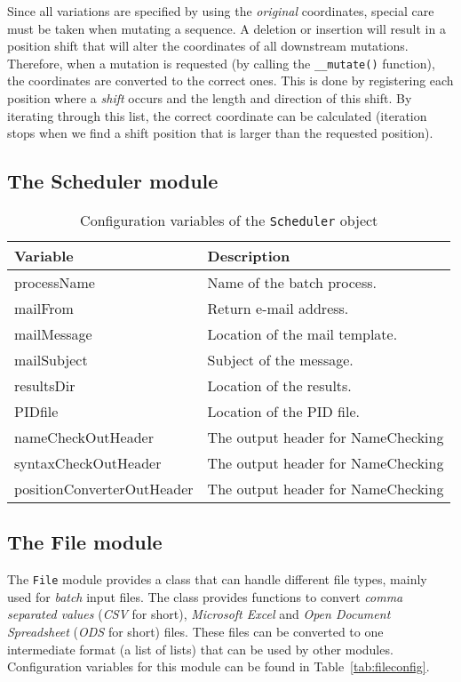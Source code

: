 \documentclass{article}
\begin{document}
Since all variations are specified by using the \emph{original} coordinates,
special care must be taken when mutating a sequence. A deletion or insertion
will result in a position shift that will alter the coordinates of all
downstream mutations. Therefore, when a mutation is requested (by calling the
\texttt{\_\_mutate()} function), the coordinates are converted to the correct
ones. This is done by registering each position where a \emph{shift} occurs
and the length and direction of this shift. By iterating through this list, the
correct coordinate can be calculated (iteration stops when we find a shift
position that is larger than the requested position).

\subsection{The Scheduler module} \label{subsec:scheduler}

\begin{table}[H]
\begin{center}
\begin{tabular}{l|l}
Variable                   & Description \\
\hline
processName                & Name of the batch process. \\
mailFrom                   & Return e-mail address. \\
mailMessage                & Location of the mail template. \\
mailSubject                & Subject of the message. \\
resultsDir                 & Location of the results. \\
PIDfile                    & Location of the PID file. \\
nameCheckOutHeader         & The output header for NameChecking \\
syntaxCheckOutHeader       & The output header for NameChecking \\
positionConverterOutHeader & The output header for NameChecking
\end{tabular}
\caption{Configuration variables of the \texttt{Scheduler} object}
\label{tab:schedulerconfig}
\end{center}
\end{table}

\subsection{The File module} \label{subsec:file}
The \texttt{File} module provides a class that can handle different file types,
mainly used for \emph{batch} input files. The class provides functions to
convert \emph{comma separated values} (\emph{CSV} for short), \emph{Microsoft
Excel} and \emph{Open Document Spreadsheet} (\emph{ODS} for short) files. These
files can be converted to one intermediate format (a list of lists) that can be
used by other modules. Configuration variables for this module can be found in
Table~\ref{tab:fileconfig}.
\end{document}
